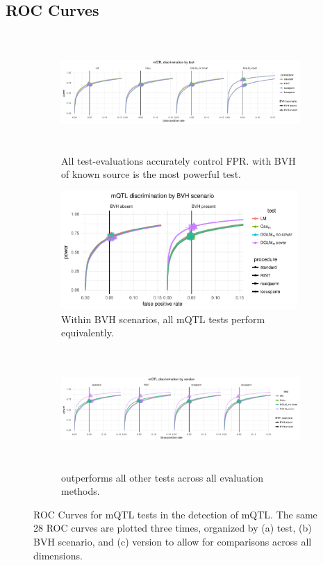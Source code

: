 \subsection{ROC Curves}
  \begin{figure}[!ht]
      \begin{subfigure}{\textwidth}
          \centering
          \includegraphics[height = 4.5cm]{images/rocs_mqtl_all_facet_by_test.pdf}
          \caption{
          All test-evaluations accurately control FPR. \DGLMm with BVH of known source is the most powerful test.}
      \vspace*{1cm}
      \end{subfigure}
      \begin{subfigure}{\textwidth}
          \centering
          \includegraphics[height = 4.5cm]{images/rocs_mqtl_all_facet_by_bvh.pdf}
          \caption{
          Within BVH scenarios, all mQTL tests perform equivalently.}
      \vspace*{1cm}
      \end{subfigure}
      \begin{subfigure}{\textwidth}
          \centering
          \includegraphics[height = 4.5cm]{images/rocs_mqtl_all_facet_by_eval.pdf}
          \caption{
          \DGLMm outperforms all other tests across all evaluation methods.}
      \end{subfigure}
      \caption[
        ROC Curves for mQTL tests in the detection of mQTL.
      ]
      {
        ROC Curves for mQTL tests in the detection of mQTL.
        The same 28 ROC curves are plotted three times, organized by (a) test, (b) BVH scenario, and (c) version to allow for comparisons across all dimensions.
      }
      \label{fig:mqtl_rocs_supp}
  \end{figure}


